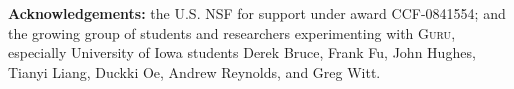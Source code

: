 \documentclass[9pt,natbib]{sigplanconf}
\begin{document}
\textbf{Acknowledgements:} the U.S. NSF for support under award
CCF-0841554; and the growing group of students and researchers
experimenting with \textsc{Guru}, especially University of Iowa
students Derek Bruce, Frank Fu, John Hughes, Tianyi Liang, Duckki Oe,
Andrew Reynolds, and Greg Witt.




\end{document}
